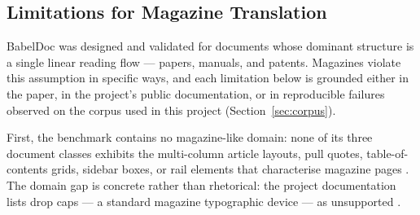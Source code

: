 \subsection{Limitations for Magazine Translation}

BabelDoc was designed and validated for documents whose dominant
structure is a single linear reading flow --- papers, manuals, and
patents. Magazines violate this assumption in specific ways, and each
limitation below is grounded either in the paper, in the project's
public documentation, or in reproducible failures observed on the
corpus used in this project (Section~\ref{sec:corpus}).

First, the benchmark contains no magazine-like domain: none of its
three document classes exhibits the multi-column article layouts,
pull quotes, table-of-contents grids, sidebar boxes, or rail elements
that characterise magazine pages \cite{qi2026babeldoc}. The domain gap
is concrete rather than rhetorical: the project documentation lists
drop caps --- a standard magazine typographic device --- as
unsupported \cite{babeldoc_repo_docs}.

